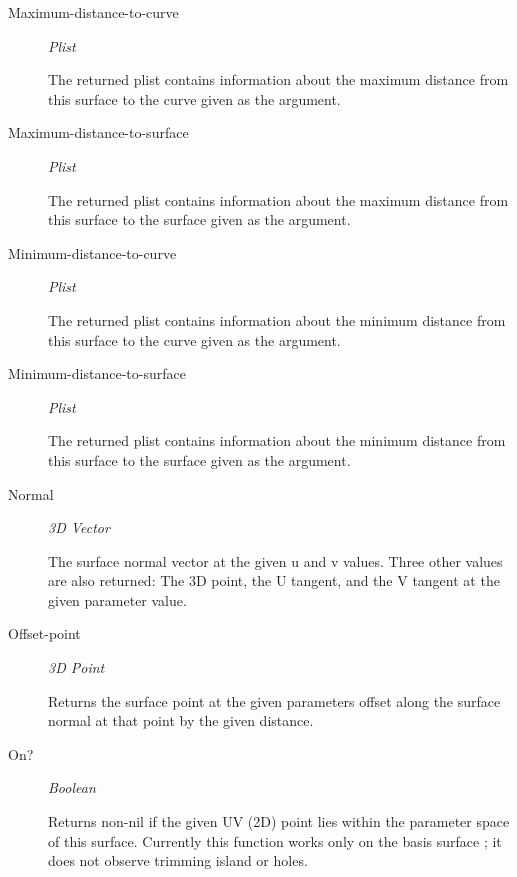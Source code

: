 \documentclass [11pt]{book}
\begin{document}
\begin{itemize}
\begin{description}
\item [Maximum-distance-to-curve]
\emph{Plist}

 The returned plist contains information about the maximum
distance from this surface to the curve given as the argument.




\item [Maximum-distance-to-surface]
\emph{Plist}

 The returned plist contains information about the maximum
distance from this surface to the surface given as the argument.




\item [Minimum-distance-to-curve]
\emph{Plist}

 The returned plist contains information about the minimum
distance from this surface to the curve given as the argument.




\item [Minimum-distance-to-surface]
\emph{Plist}

 The returned plist contains information about the minimum
distance from this surface to the surface given as the argument.




\item [Normal]
\emph{3D Vector}

 The surface normal vector at the given u and v values.
Three other values are also returned:
The 3D point, the U tangent, and the V tangent at the given parameter value.




\item [Offset-point]
\emph{3D Point}

 Returns the surface point at the given parameters offset
along the surface normal at that point by the given distance.




\item [On?]
\emph{Boolean}

 Returns non-nil if the given UV (2D) point lies within the
parameter space of this surface. Currently
this function works only on the basis surface ; it does not observe
trimming island or holes.





\end{description}
\end{itemize}
\end{document}
